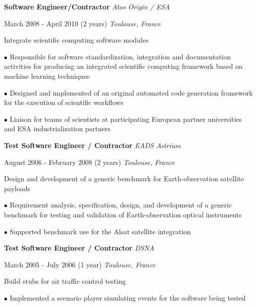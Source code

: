 \documentclass[12pt]{article}
\newcommand{\mynewsection}[2]{%
  \medskip

  \textbf{\color{colorsection}\LARGE {#1}\hspace{0.25in}{#2}}
}
\newcommand{\experience}[4]{%
  \medskip
  {\color{colorsection}\textbf{\large #1}}
  \hfill
  \textit{\small #2}

  {\small #3}
  \hfill    
  \textit{\small #4}}
\begin{document}
\begin{minipage}[t]{0.67\linewidth}
  \mynewsection{\faBriefcase}{Experience (cont.)}
  
  \experience{Software Engineer/Contractor}{Atos Origin /
    ESA}{March 2008 - April 2010 (2 years)}{Toulouse, France}

  \medskip

  {\large Integrate scientific computing software modules}

  \medskip

  $\bullet$ Responsible for software standardization, integration and
  documentation activities for producing an integrated scientific
  computing framework based on machine learning techniques

  \medskip
  
  $\bullet$ Designed and implemented of an original automated code
  generation framework for the execution of scientific workflows

  \medskip

  $\bullet$ Liaison for teams of scientists at participating European
  partner universities and ESA industrialization partners

  \bigskip
  
  \experience{Test Software Engineer / Contractor}{%
    EADS Astrium}{%
    August 2006 - February 2008 (2 years)}{%
    Toulouse, France}
  
  \medskip

  {\large Design and development of a generic benchmark for
    Earth-observation satellite payloads}

  \medskip

  $\bullet$ Requirement analysis, specification, design, and
  development of a generic benchmark for testing and validation of
  Earth-observation optical instruments

  \medskip

  $\bullet$ Supported benchmark use for the Alsat satellite
  integration

  \bigskip
  
  \experience{Test Software Engineer / Contractor}{%
    DSNA}{%
    March 2005 - July 2006 (1 year)}{%
    Toulouse, France}

  \medskip
  
  {\large Build stubs for air traffic control testing}

  \medskip

  $\bullet$ Implemented a scenario player simulating events for the
  software being tested


\end{minipage}
\end{document}
